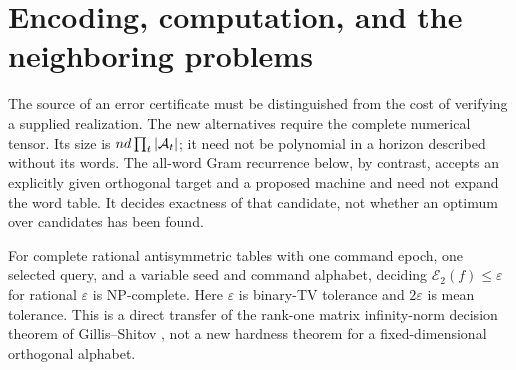 \section{Encoding, computation, and the neighboring problems}\label{sec:encoding49}
The source of an error certificate must be distinguished from the cost
of verifying a supplied realization. The new alternatives require the
complete numerical tensor. Its size is $n d\prod_t|\mathcal A_t|$; it need
not be polynomial in a horizon described without its words. The
all-word Gram recurrence below, by contrast, accepts an explicitly
given orthogonal target and a proposed machine and need not expand
the word table. It decides exactness of that candidate, not whether
an optimum over candidates has been found.

\begin{proposition}
\label{prop:hard49}
For complete rational antisymmetric tables with one command epoch,
one selected query, and a variable seed and command alphabet,
deciding $\mathcal E_2(f)\le\varepsilon$ for rational $\varepsilon$
is NP-complete. Here $\varepsilon$ is binary-TV tolerance and $2\varepsilon$ is mean tolerance. This is a direct transfer of the rank-one matrix
infinity-norm decision theorem of Gillis--Shitov \cite[Theorem 3]{GS19},
not a new hardness theorem for a fixed-dimensional orthogonal alphabet.
\end{proposition}
